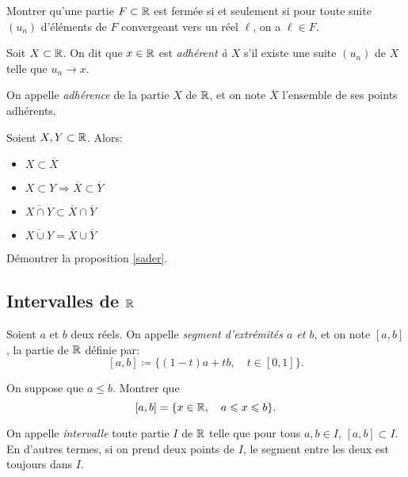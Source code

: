 \documentclass[../main.tex]{subfiles}
\begin{document}
\begin{exo}[M]
	Montrer qu'une partie $F\subset\mathbb R$ est fermée si et seulement si pour toute suite $(u_n)$ d'éléments de $F$ convergeant vers un réel $\ell$, on a $\ell\in F$.
\end{exo}

\begin{mydef}
	Soit $X\subset\mathbb R$. On dit que $x\in\mathbb R$ est \textit{adhérent à $X$} s'il existe une suite $(u_n)$ de $X$ telle que $u_n\longrightarrow x$.
\end{mydef}

\begin{mydef}[Adhérence]
	On appelle \textit{adhérence} de la partie $X$ de $\mathbb R$, et on note $\overline{X}$ l'ensemble de ses points adhérents.
\end{mydef}

\begin{prop}\label{sader}
	Soient $X,Y\subset\mathbb R$. Alors:\begin{itemize}
		\item $X\subset\overline{X}$
		\item $X\subset Y\Longrightarrow \overline{X}\subset\overline{Y}$
		\item $\overline{X\cap Y}\subset \overline{X}\cap\overline{Y}$
		\item $\overline{X\cup Y} = \overline{X}\cup\overline{Y}$
	\end{itemize}
\end{prop}

\begin{exo}[M]
	Démontrer la proposition \ref{sader}.
\end{exo}


\subsection{Intervalles de $\mathbb R$}

\begin{mydef}[Segment]
    Soient $a$ et $b$ deux réels. On appelle \textit{segment d'extrémités $a$ et $b$}, et on note $[a,b]$, la partie de $\mathbb R$ définie par:
    \[
    [a,b] \coloneqq \{(1-t)a+tb,\quad t\in[0,1] \}.
    \]
\end{mydef}

\begin{exo}[F]
    On suppose que $a\leq b$. Montrer que
    \[
    [a,b] = \{x\in\mathbb R,\quad a\leqslant x\leqslant b \}.
    \]
\end{exo}

\begin{mydef}[Intervalle]
    On appelle \textit{intervalle} toute partie $I$ de $\mathbb R$ telle que pour tous $a,b\in I$, $[a,b]\subset I$. En d'autres termes, si on prend deux points de $I$, le segment entre les deux est toujours dans $I$.
\end{mydef}
\end{document}
